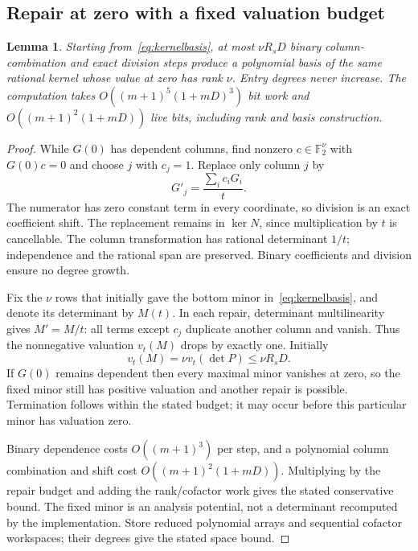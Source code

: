 \documentclass[11pt]{article}
\newtheorem{lemma}[theorem]{Lemma}
\theoremstyle{remark}\newtheorem{remark}[theorem]{Remark}
\newcommand{\F}{\mathbb F}
\begin{document}
\subsection{Repair at zero with a fixed valuation budget}
\begin{lemma}\label{lem:repair}
Starting from~\eqref{eq:kernelbasis}, at most $\nu R_sD$ binary column-combination and exact division steps produce a polynomial basis of the same rational kernel whose value at zero has rank $\nu$. Entry degrees never increase. The computation takes $O((m+1)^5(1+mD)^3)$ bit work and $O((m+1)^2(1+mD))$ live bits, including rank and basis construction.
\end{lemma}
\begin{proof}
While $G(0)$ has dependent columns, find nonzero $c\in\F_2^\nu$ with $G(0)c=0$ and choose $j$ with $c_j=1$. Replace only column $j$ by
\begin{equation}\label{eq:repair}
 G'_j=\frac{\sum_i c_iG_i}{t}.
\end{equation}
The numerator has zero constant term in every coordinate, so division is an exact coefficient shift. The replacement remains in $\ker N$, since multiplication by $t$ is cancellable. The column transformation has rational determinant $1/t$; independence and the rational span are preserved. Binary coefficients and division ensure no degree growth.

Fix the $\nu$ rows that initially gave the bottom minor in~\eqref{eq:kernelbasis}, and denote its determinant by $M(t)$. In each repair, determinant multilinearity gives $M'=M/t$: all terms except $c_j$ duplicate another column and vanish. Thus the nonnegative valuation $v_t(M)$ drops by exactly one. Initially
\[
 v_t(M)=\nu v_t(\det P)\le\nu R_sD.
\]
If $G(0)$ remains dependent then every maximal minor vanishes at zero, so the fixed minor still has positive valuation and another repair is possible. Termination follows within the stated budget; it may occur before this particular minor has valuation zero.

Binary dependence costs $O((m+1)^3)$ per step, and a polynomial column combination and shift cost $O((m+1)^2(1+mD))$. Multiplying by the repair budget and adding the rank/cofactor work gives the stated conservative bound. The fixed minor is an analysis potential, not a determinant recomputed by the implementation. Store reduced polynomial arrays and sequential cofactor workspaces; their degrees give the stated space bound.
\end{proof}
\end{document}
